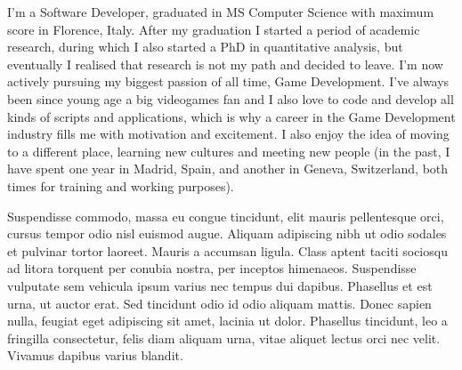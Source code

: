   \begin{cvletter}
    
      I'm a Software Developer, graduated in MS Computer Science with maximum score in Florence, Italy. After my graduation I started a period of academic research, during which I also started a PhD in quantitative analysis, but eventually I realised that research is not my path and decided to leave. I'm now actively pursuing my biggest passion of all time, Game Development. I've always been since young age a big videogames fan and I also love to code and develop all kinds of scripts and applications, which is why a career in the Game Development industry fills me with motivation and excitement. I also enjoy the idea of moving to a different place, learning new cultures and meeting new people (in the past, I have spent one year in Madrid, Spain, and another in Geneva, Switzerland, both times for training and working purposes).
    
      Suspendisse commodo, massa eu congue tincidunt, elit mauris pellentesque orci, cursus tempor odio nisl euismod augue. Aliquam adipiscing nibh ut odio sodales et pulvinar tortor laoreet. Mauris a accumsan ligula. Class aptent taciti sociosqu ad litora torquent per conubia nostra, per inceptos himenaeos. Suspendisse vulputate sem vehicula ipsum varius nec tempus dui dapibus. Phasellus et est urna, ut auctor erat. Sed tincidunt odio id odio aliquam mattis. Donec sapien nulla, feugiat eget adipiscing sit amet, lacinia ut dolor. Phasellus tincidunt, leo a fringilla consectetur, felis diam aliquam urna, vitae aliquet lectus orci nec velit. Vivamus dapibus varius blandit.
    
      

\end{cvletter}
